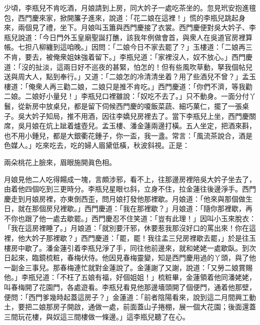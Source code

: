 少頃，李瓶兒不肯吃酒，月娘請到上房，同大妗子一處吃茶坐的。忽見玳安抱進氊包，西門慶來家，掀開簾子進來，說道：「花二娘在這裡！」慌的李瓶兒跳起身來，兩個見了禮，坐下。月娘叫玉簫與西門慶接了衣裳。西門慶便對吳大妗子、李瓶兒說道：「今日門外玉皇廟聖誕打醮，該我年例做會首，與衆人在吳道官房裡算帳。七担八柳纏到這咱晚。」因問：「二娘今日不家去罷了？」玉樓道：「二娘再三不肯，要去，被俺衆姐妹強着留下。」李瓶兒道：「家裡沒人，奴不放心。」西門慶道：「沒的扯淡，這兩日好不巡夜的甚緊，怕怎的！但有些風吹草動，拏我個帖兒送與周大人，點到奉行。」又道：「二娘怎的冷清清坐着？{}{}用了些酒兒不曾？」孟玉樓道：「俺衆人再三勸二娘，二娘只是推不肯吃。」西門慶道：「你們不濟，等我勸二娘。二娘好小量兒！」{}李瓶兒口裡雖說：「奴吃不去了。」只不動身。一面分付丫鬟，從新房中放桌兒，都是留下伺候西門慶的嗄飯菜蔬、細巧菓仁，擺了一張桌子。吳大妗子知局，推不用酒，因往李嬌兒房裡去了。{}當下李瓶兒上坐，西門慶關席，吳月娘在炕上跐着爐壺兒。{}孟玉樓、潘金蓮兩邊打橫。五人坐定，把酒來斟，也不用小鍾兒，都是大銀衢花鍾子，你一盃，我一盞。常言：「風流茶說合，酒是色媒人。」吃來吃去，吃的婦人眉黛低橫，秋波斜視。{}正是：

\begin{myquote}
兩朵桃花上臉來，眉眼施開眞色相。
\end{myquote}

月娘見他二人吃得餳成一塊，言頗涉邪，看不上，{}往那邊房裡陪吳大妗子坐去了，由着他四個吃到三更時分。李瓶兒星眼乜斜，立身不住，拉金蓮往後邊淨手。西門慶走到月娘房裡，亦東倒西歪，問月娘打發他那裡歇。月娘道：「他來與那個做生日，就在那個房兒裡歇。」西門慶道：「我在那裡歇？」{}月娘道：「隨你那裡歇，再不你也跟了他一處去歇罷。」西門慶忍不住笑道：「豈有此理！」因叫小玉來脫衣：「我在這房裡睡了。」{}月娘道：「就別要汗邪，休要惹我那沒好口的罵出來！你在這裡，他大妗子那裡歇？」西門慶道：「罷，罷！{}我往孟三兒房裡歇去罷，」於是往玉樓房中歇了。潘金蓮引着李瓶兒淨了手，同往他前邊來，就和姥姥一處歇臥。到次日起來，臨鏡梳粧，春梅伏侍。他因見春梅靈變，知是西門慶用過的丫頭，與了他一副金三事兒。{}那春梅連忙就對金蓮說了。金蓮謝了又謝，說道：「又勞二娘賞賜他。」李瓶兒道：「不枉了五娘有福，好個姐姐！」梳粧畢，金蓮領着他同潘姥姥，叫春梅開了花園門，各處遊看。李瓶兒看見他那邊墻頭開了個便門，通着他那壁，便問：「西門爹幾時起蓋這房子？」金蓮道：「前者陰陽看來，說到這二月間興工動土，要把二娘那房子開啟，通做一處，前面蓋山子捲棚，展一個大花園；後面還蓋三間玩花樓，與奴這三間樓做一條邊。」這李瓶兒聽了在心。

